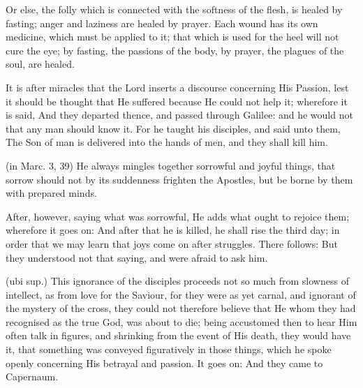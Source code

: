  Or else, the folly which is connected with the softness of the flesh, is healed by fasting; anger and laziness are healed by prayer. Each wound has its own medicine, which must be applied to it; that which is used for the heel will not cure the eye; by fasting, the passions of the body, by prayer, the plagues of the soul, are healed.

 

 It is after miracles that the Lord inserts a discourse concerning His Passion, lest it should be thought that He suffered because He could not help it; wherefore it is said, And they departed thence, and passed through Galilee: and he would not that any man should know it. For he taught his disciples, and said unto them, The Son of man is delivered into the hands of men, and they shall kill him.

 (in Marc. 3, 39) He always mingles together sorrowful and joyful things, that sorrow should not by its suddenness frighten the Apostles, but be borne by them with prepared minds.

 After, however, saying what was sorrowful, He adds what ought to rejoice them; wherefore it goes on: And after that he is killed, he shall rise the third day; in order that we may learn that joys come on after struggles. There follows: But they understood not that saying, and were afraid to ask him.

 (ubi sup.) This ignorance of the disciples proceeds not so much from slowness of intellect, as from love for the Saviour, for they were as yet carnal, and ignorant of the mystery of the cross, they could not therefore believe that He whom they had recognised as the true God, was about to die; being accustomed then to hear Him often talk in figures, and shrinking from the event of His death, they would have it, that something was conveyed figuratively in those things, which he spoke openly concerning His betrayal and passion. It goes on: And they came to Capernaum.

